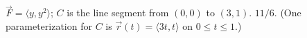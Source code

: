 {$\vec F = \langle y, y^2\rangle$; $C$ is the line segment from $(0,0)$ to $(3,1)$.
}
{$11/6$. (One parameterization for $C$ is $\vec r(t) = \langle 3t,t\rangle$ on $0\leq t\leq 1$.)
}
